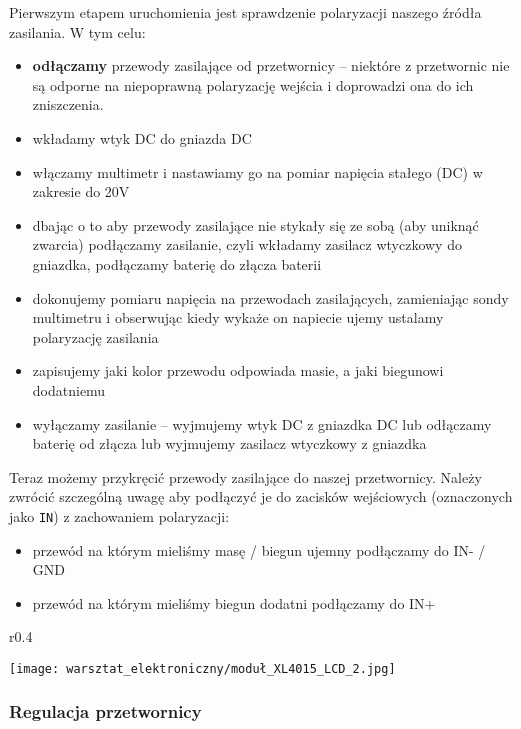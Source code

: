 \documentclass{pdfBooklets}
\begin{document}
\vspace{13pt}\noindent
Pierwszym etapem uruchomienia jest sprawdzenie polaryzacji naszego źródła zasilania. W tym celu:
\begin{itemize}
	\item \textbf{odłączamy} przewody zasilające od przetwornicy – niektóre z przetwornic nie są odporne na niepoprawną polaryzację wejścia i doprowadzi ona do ich zniszczenia.
	\item wkładamy wtyk DC do gniazda DC
	\item włączamy multimetr i nastawiamy go na pomiar napięcia stałego (DC) w zakresie do 20V
	\item dbając o to aby przewody zasilające nie stykały się ze sobą (aby uniknąć zwarcia) podłączamy zasilanie, czyli wkładamy zasilacz wtyczkowy do gniazdka, podłączamy baterię do złącza baterii
	\item dokonujemy pomiaru napięcia na przewodach zasilających, zamieniając sondy multimetru i obserwując kiedy wykaże on napiecie ujemy ustalamy polaryzację zasilania
	\item zapisujemy jaki kolor przewodu odpowiada masie, a jaki biegunowi dodatniemu
	\item wyłączamy zasilanie – wyjmujemy wtyk DC z gniazdka DC lub odłączamy baterię od złącza lub wyjmujemy zasilacz wtyczkowy z gniazdka
\end{itemize}
Teraz możemy przykręcić przewody zasilające do naszej przetwornicy. Należy zwrócić szczególną uwagę aby podłączyć je do zacisków wejściowych (oznaczonych jako \texttt{IN}) z zachowaniem polaryzacji:
\begin{itemize}
	\item przewód na którym mieliśmy masę / biegun ujemny podłączamy do IN- / GND
	\item przewód na którym mieliśmy biegun dodatni podłączamy do IN+
\end{itemize}

\begin{wrapfigure}{r}{0.4\textwidth}
  \begin{center}
    \vspace{-40pt}
    \texttt{[image: warsztat\_elektroniczny/moduł\_XL4015\_LCD\_2.jpg]}
    \vspace{-50pt}
  \end{center}
\end{wrapfigure}

\subsubsection{Regulacja przetwornicy}
\end{document}
